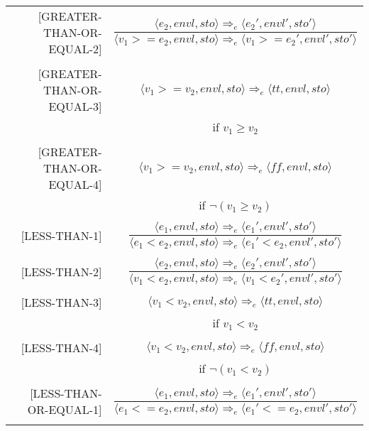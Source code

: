 \begin{longtable}[c] { r c }
  [GREATER-THAN-OR-EQUAL-2] & \( 
    \dfrac { \langle e_2, envl, sto \rangle \Rightarrow_e \langle e_2', envl', sto' \rangle }
      { \langle v_1 > = e_2, envl, sto \rangle \Rightarrow_e \langle v_1 > = e_2', envl', sto' \rangle } \)
  \\
  & \\

  [GREATER-THAN-OR-EQUAL-3] & \( 
    \langle v_1 > = v_2, envl, sto \rangle \Rightarrow_e \langle tt, envl, sto \rangle \)
  \\
  & if \( v_1 \geq v_2 \) \\
  & \\

  [GREATER-THAN-OR-EQUAL-4] & \( 
    \langle v_1 > = v_2, envl, sto \rangle \Rightarrow_e \langle ff, envl, sto \rangle \)
  \\
  & if \( \neg(v_1 \geq v_2) \) \\
  & \\

  [LESS-THAN-1] & \( 
    \dfrac { \langle e_1, envl, sto \rangle \Rightarrow_e \langle e_1', envl', sto' \rangle }
      { \langle e_1 < e_2, envl, sto \rangle \Rightarrow_e \langle e_1' < e_2, envl', sto' \rangle } \)
  \\
  & \\

  [LESS-THAN-2] & \( 
    \dfrac { \langle e_2, envl, sto \rangle \Rightarrow_e \langle e_2', envl', sto' \rangle }
      { \langle v_1 < e_2, envl, sto \rangle \Rightarrow_e \langle v_1 < e_2', envl', sto' \rangle } \)
  \\
  & \\

  [LESS-THAN-3] & \( 
    \langle v_1 < v_2, envl, sto \rangle \Rightarrow_e \langle tt, envl, sto \rangle \)
  \\
  & if \( v_1 < v_2 \) \\
  & \\

  [LESS-THAN-4] & \( 
    \langle v_1 < v_2, envl, sto \rangle \Rightarrow_e \langle ff, envl, sto \rangle \)
  \\
  & if \( \neg(v_1 < v_2) \) \\
  & \\

  [LESS-THAN-OR-EQUAL-1] & \( 
    \dfrac { \langle e_1, envl, sto \rangle \Rightarrow_e \langle e_1', envl', sto' \rangle }
      { \langle e_1 < = e_2, envl, sto \rangle \Rightarrow_e \langle e_1' < = e_2, envl', sto' \rangle } \)
  \\
  & \\


\end{longtable}
